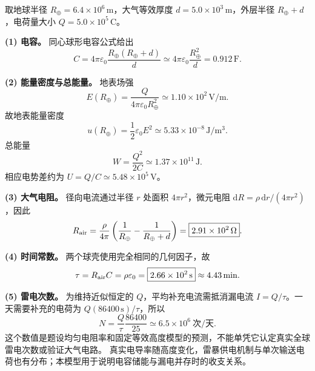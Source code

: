 {\begin{xesolution}
取地球半径 $R_\oplus=6.4\times10^6\,\mathrm m$，大气等效厚度
$d=5.0\times10^3\,\mathrm m$，外层半径 $R_\oplus+d$，电荷量大小
$Q=5.0\times10^5\,\mathrm C$。

\textbf{(1) 电容。} 同心球形电容公式给出
\[
 C=4\pi\varepsilon_0\frac{R_\oplus(R_\oplus+d)}d
 \simeq4\pi\varepsilon_0\frac{R_\oplus^2}{d}
 =\boxed{0.912\,\mathrm F}.
\]

\textbf{(2) 能量密度与总能量。} 地表场强
\[
 E(R_\oplus)=\frac{Q}{4\pi\varepsilon_0R_\oplus^2}
 \simeq1.10\times10^2\,\mathrm{V/m}.
\]
故地表能量密度
\[
 \boxed{u(R_\oplus)=\frac12\varepsilon_0E^2
 \simeq5.33\times10^{-8}\,\mathrm{J/m^3}}.
\]
总能量
\[
 \boxed{W=\frac{Q^2}{2C}\simeq1.37\times10^{11}\,\mathrm J}.
\]
相应电势差约为 $U=Q/C\simeq5.48\times10^5\,\mathrm V$。

\textbf{(3) 大气电阻。} 径向电流通过半径 $r$ 处面积 $4\pi r^2$，微元电阻
$\mathrm dR=\rho\,\mathrm dr/(4\pi r^2)$，因此
\[
 R_{\rm air}=\frac\rho{4\pi}
 \left(\frac1{R_\oplus}-\frac1{R_\oplus+d}\right)
 =\boxed{2.91\times10^2\,\Omega}.
\]

\textbf{(4) 时间常数。} 两个球壳使用完全相同的几何因子，故
\[
 \tau=R_{\rm air}C=\rho\varepsilon_0
 =\boxed{2.66\times10^2\,\mathrm s}\approx4.43\,\mathrm{min}.
\]

\textbf{(5) 雷电次数。} 为维持近似恒定的 $Q$，平均补充电流需抵消漏电流
$I=Q/\tau$。一天需要补充的电荷为 $Q(86400\,\mathrm s)/\tau$，所以
\[
 N=\frac{Q}{\tau}\frac{86400}{25}
 \simeq\boxed{6.5\times10^6\ \text{次/天}}.
\]
这个数值是题设均匀电阻率和固定等效高度模型的预测，不能单凭它认定真实全球雷电次数或验证大气电路。
真实电导率随高度变化，雷暴供电机制与单次输送电荷也有分布；本模型用于说明电容储能与漏电并存时的收支关系。
\end{xesolution}
}

\endgroup

\endgroup
